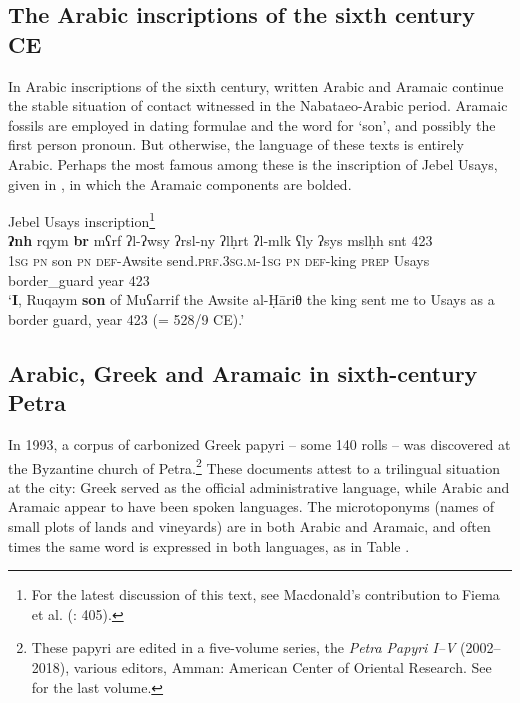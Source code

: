 \documentclass[output=paper]{langsci/langscibook}
\begin{document}
\subsection{The Arabic inscriptions of the sixth century CE}
In Arabic inscriptions of the sixth century, written Arabic and Aramaic continue the stable situation of contact witnessed in the Nabataeo-Arabic period. Aramaic fossils are employed in dating formulae and the word for ‘son’, and possibly the first person pronoun. But otherwise, the language of these texts is entirely Arabic. Perhaps the most famous among these is the inscription of Jebel Usays, given in , in which the Aramaic components are bolded.

\ea\label{Usays} Jebel Usays inscription\footnote{For the latest discussion of this text, see Macdonald’s contribution to Fiema et al. (\citeyear{Fiemaetal2015}: 405).}\\
\gll   \textbf{ʔnh}\footnotemark{} rqym \textbf{br} mʕrf ʔl-ʔwsy ʔrsl-ny ʔlḥrt ʔl-mlk ʕly ʔsys mslḥh snt 423 \\
       \textsc{1sg} \textsc{pn} son \textsc{pn} \textsc{def}-Awsite send.\textsc{prf.3sg.m-1sg} \textsc{pn} \textsc{def}-king \textsc{prep} Usays border\_guard year 423  \\
\glt   `\textbf{I}, Ruqaym \textbf{son} of Muʕarrif the Awsite al-Ḥāriθ the king sent me to Usays as a border guard, year 423 (= 528/9 CE).'\\
\z{}

\subsection{Arabic, Greek and Aramaic in sixth-century Petra}
In 1993, a corpus of carbonized Greek papyri – some 140 rolls – was discovered at the Byzantine church of Petra.\footnote{These papyri are edited in a five-volume series, the \textit{Petra Papyri I--V} (2002--2018), various editors, Amman: American Center of Oriental
Research. See \citet{Arjavaetal2018} for the last volume.} These documents attest to a trilingual situation at the city: Greek served as the official administrative language, while Arabic and Aramaic appear to have been spoken languages. The microtoponyms (names of small plots of lands and vineyards) are in both Arabic and Aramaic, and often times the same word is expressed in both languages, as in Table . 
\end{document}
